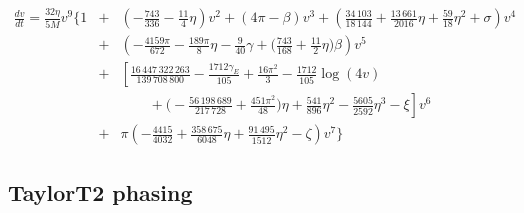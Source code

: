 \begin{eqnarray} \label{eq:dvByDt}
\frac{dv}{dt} = \frac{32 \eta}{5 M} v^9 \Bigg\{
1 &+& 
\left( -\frac{743}{336} - \frac{11}{4} \eta \right) v^2
+ (4 \pi - \beta) v^3
+ \left( \frac{34\,103}{18\,144} + \frac{13\,661}{2016} \eta + \frac{59}{18} \eta^2 + \sigma \right) v^4
\nonumber \\
&+& \left( -\frac{4159 \pi}{672} -\frac{189 \pi}{8} \eta - \frac{9}{40} \gamma + \Big(\frac{743}{168} + \frac{11}{2} \eta \Big) \beta \right) v^5
\nonumber \\
&+& \left[ \frac{16\,447\,322\,263}{139\,708\,800} - \frac{1712 \gamma_E}{105} + \frac{16 \pi^2}{3} - \frac{1712}{105} \log (4 v) \right.
\nonumber \\
& & \qquad + \left. \Big(-\frac{56\,198\,689}{217\,728} + \frac{451 \pi ^2}{48} \Big) \eta + \frac{541}{896} \eta^2 - \frac{5605}{2592} \eta^3 - \xi \right] v^6 \nonumber \\
&+& \pi \left( -\frac{4415}{4032} + \frac{358\,675}{6048} \eta + \frac{91\,495}{1512} \eta^2 - \zeta \right) v^7
\Bigg\}
\end{eqnarray}


\subsection{TaylorT2 phasing}

